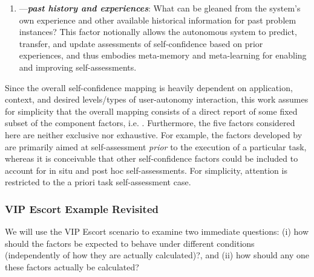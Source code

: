 \begin{enumerate}
%
\item \xP---\textit{\textbf{past history and experiences}}: What can be gleaned from the system's own experience and other available historical information for past problem instances?  
This factor notionally allows the autonomous system to predict, transfer, and update assessments of self-confidence based on prior experiences, and thus embodies meta-memory and meta-learning for enabling and improving self-assessments. 
\end{enumerate}

Since the overall self-confidence mapping is heavily dependent on application, context, and desired levels/types of user-autonomy interaction, this work assumes for simplicity that the overall mapping consists of a direct report of some fixed subset of the component factors, i.e. \xSC. 
Furthermore, the five factors considered here are neither exclusive nor exhaustive. For example, the factors developed by \cite{Aitken2016-cv, Aitken2016-fb} are primarily aimed at self-assessment \emph{prior} to the execution of a particular task, whereas it is conceivable that other self-confidence factors could be included to account for in situ and post hoc self-assessments. For simplicity, attention is restricted to the a priori task self-assessment case. %


\subsubsection{VIP Escort Example Revisited}

We will use the VIP Escort scenario to examine two immediate questions: (i) how should the factors be expected to behave under different conditions (independently of how they are actually calculated)?, and (ii) how should any one these factors actually be calculated?  

